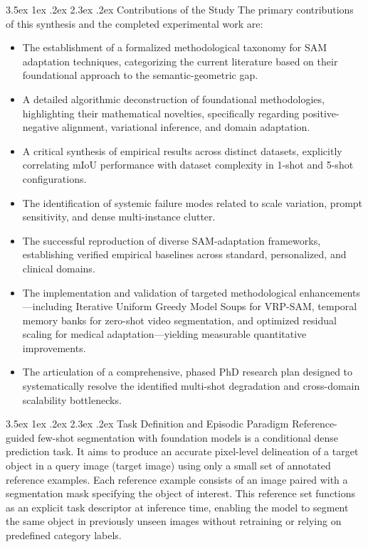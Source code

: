 \documentclass[journal,12pt,onecolumn,draftclsnofoot]{IEEEtran}
\makeatletter
\renewcommand{\section}{\@startsection{section}{1}{\z@}%
    {3.5ex \@plus 1ex \@minus .2ex}%
    {2.3ex \@plus.2ex}%
    {\normalfont\Large\bfseries}}
\makeatother
\begin{document}
\section{Contributions of the Study}
The primary contributions of this synthesis and the completed experimental work are:
\begin{itemize}
    \item The establishment of a formalized methodological taxonomy for SAM adaptation techniques, categorizing the current literature based on their foundational approach to the semantic-geometric gap.
    \item A detailed algorithmic deconstruction of foundational methodologies, highlighting their mathematical novelties, specifically regarding positive-negative alignment, variational inference, and domain adaptation.
    \item A critical synthesis of empirical results across distinct datasets, explicitly correlating mIoU performance with dataset complexity in 1-shot and 5-shot configurations.
    \item The identification of systemic failure modes related to scale variation, prompt sensitivity, and dense multi-instance clutter.
    \item The successful reproduction of diverse SAM-adaptation frameworks, establishing verified empirical baselines across standard, personalized, and clinical domains.
    \item The implementation and validation of targeted methodological enhancements---including Iterative Uniform Greedy Model Soups for VRP-SAM, temporal memory banks for zero-shot video segmentation, and optimized residual scaling for medical adaptation---yielding measurable quantitative improvements.
    \item The articulation of a comprehensive, phased PhD research plan designed to systematically resolve the identified multi-shot degradation and cross-domain scalability bottlenecks.
\end{itemize}


\section{Task Definition and Episodic Paradigm}
Reference-guided few-shot segmentation with foundation models is a conditional dense prediction task. It aims to produce an accurate pixel-level delineation of a target object in a query image (target image) using only a small set of annotated reference examples. Each reference example consists of an image paired with a segmentation mask specifying the object of interest. This reference set functions as an explicit task descriptor at inference time, enabling the model to segment the same object in previously unseen images without retraining or relying on predefined category labels.
\end{document}
